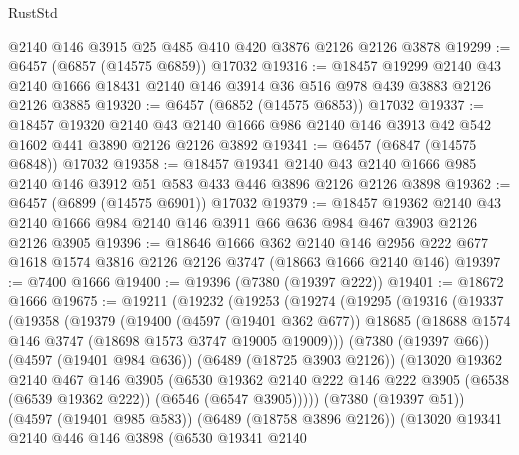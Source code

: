 \begin{lexlean}{RustStd}
\begin{coremodule}
    @2140
    @146
    @3915
    @25
    @485
    @410
    @420
    @3876
    @2126
    @2126
    @3878
@19299 := @6457 (@6857 (@14575 @6859)) @17032
@19316 := @18457
    @19299
    @2140
    @43
    @2140
    @1666
    @18431
    @2140
    @146
    @3914
    @36
    @516
    @978
    @439
    @3883
    @2126
    @2126
    @3885
@19320 := @6457 (@6852 (@14575 @6853)) @17032
@19337 := @18457
    @19320
    @2140
    @43
    @2140
    @1666
    @986
    @2140
    @146
    @3913
    @42
    @542
    @1602
    @441
    @3890
    @2126
    @2126
    @3892
@19341 := @6457 (@6847 (@14575 @6848)) @17032
@19358 := @18457
    @19341
    @2140
    @43
    @2140
    @1666
    @985
    @2140
    @146
    @3912
    @51
    @583
    @433
    @446
    @3896
    @2126
    @2126
    @3898
@19362 := @6457 (@6899 (@14575 @6901)) @17032
@19379 := @18457
    @19362
    @2140
    @43
    @2140
    @1666
    @984
    @2140
    @146
    @3911
    @66
    @636
    @984
    @467
    @3903
    @2126
    @2126
    @3905
@19396 := @18646
    @1666
    @362
    @2140
    @146
    @2956
    @222
    @677
    @1618
    @1574
    @3816
    @2126
    @2126
    @3747
    (@18663 @1666 @2140 @146)
@19397 := @7400 @1666
@19400 := @19396 (@7380 (@19397 @222))
@19401 := @18672 @1666
@19675 := @19211
    (@19232
      (@19253
        (@19274
          (@19295
            (@19316
              (@19337
                (@19358
                  (@19379
                    (@19400
                      (@4597 (@19401 @362 @677))
                      @18685
                      (@18688 @1574 @146 @3747 (@18698 @1573 @3747 @19005 @19009)))
                    (@7380 (@19397 @66))
                    (@4597 (@19401 @984 @636))
                    (@6489 (@18725 @3903 @2126))
                    (@13020
                      @19362
                      @2140
                      @467
                      @146
                      @3905
                      (@6530
                        @19362
                        @2140
                        @222
                        @146
                        @222
                        @3905
                        (@6538 (@6539 @19362 @222))
                        (@6546 (@6547 @3905)))))
                  (@7380 (@19397 @51))
                  (@4597 (@19401 @985 @583))
                  (@6489 (@18758 @3896 @2126))
                  (@13020
                    @19341
                    @2140
                    @446
                    @146
                    @3898
                    (@6530
                      @19341
                      @2140

\end{coremodule}
\end{lexlean}
